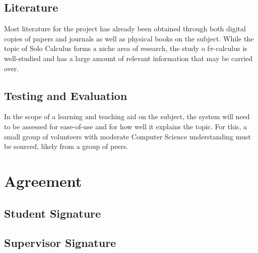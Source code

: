 \documentclass{article}
\begin{document}
\subsection{Literature}
Most literature for the project has already been obtained through both digital copies of papers and journals as well as physical books on the subject. While the topic of Solo Calculus forms a niche area of research, the study o f$\pi$-calculus is well-studied and has a large amount of relevant information that may be carried over.

\subsection{Testing and Evaluation}
In the scope of a learning and teaching aid on the subject, the system will need to be assessed for ease-of-use and for how well it explains the topic. For this, a small group of volunteers with moderate Computer Science understanding must be sourced, likely from a group of peers.


\section{Agreement}
\subsection{Student Signature}
\vspace{1in}

\subsection{Supervisor Signature}
\vspace{1in}
\end{document}
